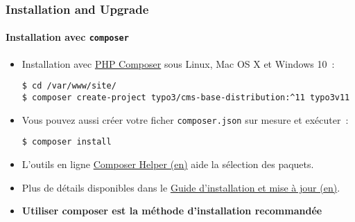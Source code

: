 %

\begin{frame}[fragile]
	\frametitle{Installation and Upgrade}
	\framesubtitle{Installation avec \texttt{composer}}


	\begin{itemize}
		\item Installation avec \href{https://getcomposer.org}{PHP Composer} sous Linux, Mac OS X et Windows 10~:
\begin{lstlisting}
$ cd /var/www/site/
$ composer create-project typo3/cms-base-distribution:^11 typo3v11
\end{lstlisting}

		\item Vous pouvez aussi créer votre ficher \texttt{composer.json} sur mesure
			et exécuter~:
\begin{lstlisting}
$ composer install
\end{lstlisting}

		\item L'outils en ligne \href{https://get.typo3.org/misc/composer/helper}{Composer Helper (en)}
			aide la sélection des paquets.

		\item Plus de détails disponibles dans le
			\href{https://docs.typo3.org/m/typo3/guide-installation/master/en-us/}{Guide d'installation et mise à jour (en)}.

		\item \textbf{Utiliser composer est la méthode d'installation recommandée}

	\end{itemize}
\end{frame}

